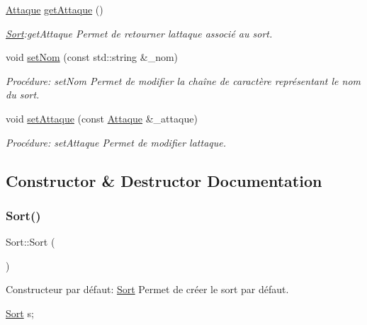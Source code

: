 \begin{DoxyCompactItemize}
\hyperlink{classAttaque}{Attaque} \hyperlink{classSort_ac24b0d4c2caf033df5ddcc3f281bc634}{get\+Attaque} ()
\begin{DoxyCompactList}\small\item\em \hyperlink{classSort}{Sort}\+:get\+Attaque Permet de retourner l\textquotesingle{}attaque associé au sort. \end{DoxyCompactList}\item 
void \hyperlink{classSort_af1eb5e9ab593b1c6b9e1d94ad1117b4f}{set\+Nom} (const std\+::string \&\+\_\+nom)
\begin{DoxyCompactList}\small\item\em Procédure\+: set\+Nom Permet de modifier la chaîne de caractère représentant le nom du sort. \end{DoxyCompactList}\item 
void \hyperlink{classSort_ae8380b142e31fdad8afae89bbfaeffc5}{set\+Attaque} (const \hyperlink{classAttaque}{Attaque} \&\+\_\+attaque)
\begin{DoxyCompactList}\small\item\em Procédure\+: set\+Attaque Permet de modifier l\textquotesingle{}attaque. \end{DoxyCompactList}\end{DoxyCompactItemize}


\subsection{Constructor \& Destructor Documentation}
\mbox{\label{classSort_a89ab0e273ec62afb2c1a3b7fc5671503}} 
\subsubsection{\texorpdfstring{Sort()}{Sort()}\hspace{0.1cm}{\footnotesize\ttfamily [1/3]}}
{\footnotesize\ttfamily Sort\+::\+Sort (\begin{DoxyParamCaption}{ }\end{DoxyParamCaption})}



Constructeur par défaut\+: \hyperlink{classSort}{Sort} Permet de créer le sort par défaut. 


\begin{DoxyCode}
\hyperlink{classSort}{Sort} s;
\end{DoxyCode}
 \mbox{\label{classSort_a0b765452defe7f6f0c6fe4dbec471e7c}} 
